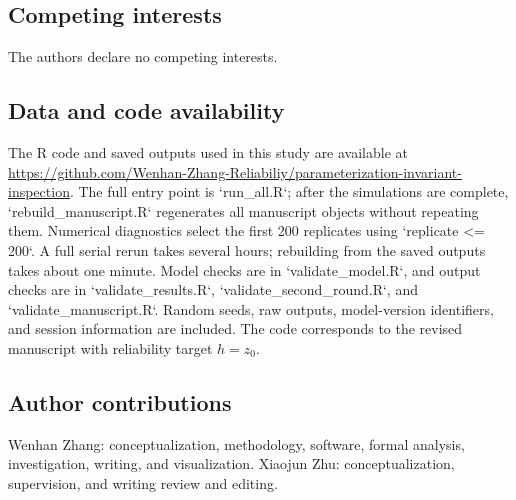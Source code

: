 \documentclass[a4paper,fleqn]{cas-sc}
\begin{document}
\subsection*{Competing interests}
The authors declare no competing interests.

\subsection*{Data and code availability}
The R code and saved outputs used in this study are available at \url{https://github.com/Wenhan-Zhang-Reliabiliy/parameterization-invariant-inspection}. The full entry point is `run\_all.R`; after the simulations are complete, `rebuild\_manuscript.R` regenerates all manuscript objects without repeating them. Numerical diagnostics select the first 200 replicates using `replicate <= 200`. A full serial rerun takes several hours; rebuilding from the saved outputs takes about one minute. Model checks are in `validate\_model.R`, and output checks are in `validate\_results.R`, `validate\_second\_round.R`, and `validate\_manuscript.R`. Random seeds, raw outputs, model-version identifiers, and session information are included. The code corresponds to the revised manuscript with reliability target $h=z_0$.

\subsection*{Author contributions}
Wenhan Zhang: conceptualization, methodology, software, formal analysis, investigation, writing, and visualization. Xiaojun Zhu: conceptualization, supervision, and writing review and editing.



\end{document}
